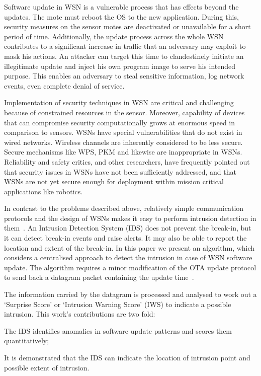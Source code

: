 \documentclass[conference,manuscript]{IEEEtran}
\begin{document}
Software update in WSN is a vulnerable process that has
effects beyond the updates. 
The mote must reboot the OS to the new application.
During
this, security measures on the sensor motes are deactivated or
unavailable for a short period of time. Additionally, the update
process across the whole WSN contributes to a significant
increase in traffic that an adversary may exploit to mask his
actions. An attacker can target this time to clandestinely initiate
an illegitimate update and inject his own program image
to serve his intended purpose. This enables an adversary to
steal sensitive information, log network events, even complete
denial of service.

Implementation of security techniques in WSN are critical
and challenging because of constrained resources in the sensor.
Moreover, capability of devices that can compromise security
computationally grows at enormous speed in comparison to
sensors. 
%
WSNs have special vulnerabilities
that do not exist in wired networks. Wireless channels are
inherently considered to be less secure. Secure mechanisms
like WPS, PKM and likewise are inappropriate in WSNs.
Reliability and safety critics, and other researchers, have
frequently pointed out that security issues in WSNs have not
been sufficiently addressed, and that WSNs are not yet secure
enough for deployment within mission critical applications like
robotics.

In contrast to the problems described above, relatively
simple communication protocols and the design of WSNs
makes it easy to perform intrusion detection in them~\cite{quing09}.
An Intrusion Detection System (IDS) does not prevent the
break-in, but it can detect break-in events and raise alerts. It
may also be able to report the location and extent of the break-in. 
In this paper we present an algorithm, which considers a
centralised approach to detect the intrusion in case of WSN
software update. The algorithm requires a minor modification
of the OTA update protocol to send back a datagram packet
containing the update time~\cite{tep116}.

The information carried by the
datagram is processed and analysed to work out a `Surprise
Score' or `Intrusion Warning Score' (IWS) to indicate a
possible intrusion. 
This work's contributions are two fold: 
\begin{inparaenum}
\item  The IDS identifies anomalies in software update patterns
and scores them quantitatively;
\item It is demonstrated that the IDS
can indicate the location of intrusion point and possible extent
of intrusion.
\end{inparaenum}
\end{document}
